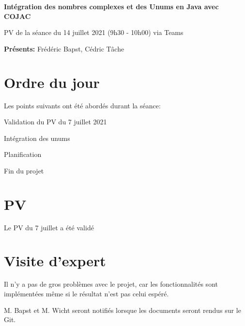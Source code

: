 \documentclass[11pt]{meetingmins}
\date{14 juillet 2021}
\begin{document}
\begin {center} {
    \large \textbf {Intégration des nombres complexes et des Unums en Java avec COJAC}
}
\vspace {0.5ex}

PV de la séance du 14 juillet 2021 (9h30 - 10h00) via Teams
\end {center} \vspace {1.5em}

\noindent
\textbf{Présents:} Frédéric Bapst, Cédric Tâche

\section{Ordre du jour}
Les points suivants ont été abordés durant la séance:
\begin{hiddenitems}
    \item Validation du PV du 7 juillet 2021
    \item Intégration des unums
    \item Planification
    \item Fin du projet
\end{hiddenitems}

\section{PV}
\begin{hiddenitems}
    \item Le PV du 7 juillet a été validé
\end{hiddenitems}

\section{Visite d'expert}
\begin{hiddenitems}
    \item Il n'y a pas de gros problèmes avec le projet, car les fonctionnalités sont implémentées même si le résultat n'est pas celui espéré.
    \item M. Bapst et M. Wicht seront notifiés lorsque les documents seront rendus sur le Git.
\end{hiddenitems}
\end{document}
